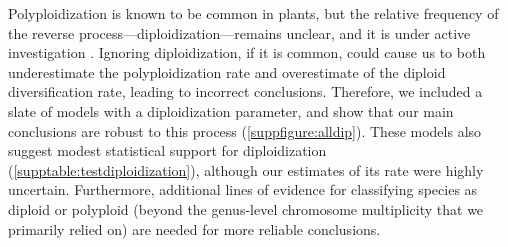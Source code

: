 Polyploidization is known to be common in plants, but the relative frequency of the reverse process---diploidization---remains unclear, and it is under active investigation \citep{dodsworth_2015,mandakova_2018}.
%
Ignoring diploidization, if it is common, could cause us to both underestimate the polyploidization rate and overestimate of the diploid diversification rate, leading to incorrect conclusions.
Therefore, we included a slate of models with a diploidization parameter, and show that our main conclusions are robust to this process (\cref{suppfigure:alldip}).
These models also suggest modest statistical support for diploidization (\cref{supptable:testdiploidization}), although our estimates of its rate were highly uncertain. 
Furthermore, additional lines of evidence for classifying species as diploid or polyploid (beyond the genus-level chromosome multiplicity that we primarily relied on) are needed for more reliable conclusions.


